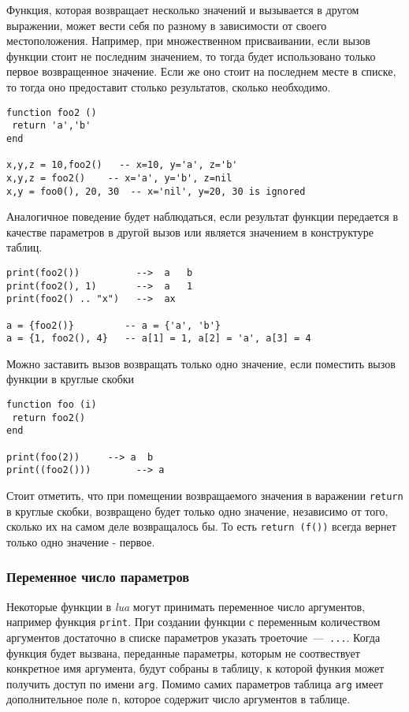 Функция, которая возвращает несколько значений и вызывается в другом выражении, может вести себя по разному в зависимости от своего местоположения. Например, при множественном присваивании, если вызов функции стоит не последним значением, то тогда будет использовано только первое возвращенное значение. Если же оно стоит на последнем месте в списке, то тогда оно предоставит столько результатов, сколько необходимо.

\begin{lstlisting}
function foo2 ()
 return 'a','b' 
end

x,y,z = 10,foo2()   -- x=10, y='a', z='b'
x,y,z = foo2()    -- x='a', y='b', z=nil
x,y = foo0(), 20, 30  -- x='nil', y=20, 30 is ignored

\end{lstlisting}

Аналогичное поведение будет наблюдаться, если результат функции передается в качестве параметров в другой вызов или является значением в конструктуре таблиц.

\begin{lstlisting}
print(foo2())          -->  a   b
print(foo2(), 1)       -->  a   1
print(foo2() .. "x")   -->  ax  

a = {foo2()}         -- a = {'a', 'b'}
a = {1, foo2(), 4}   -- a[1] = 1, a[2] = 'a', a[3] = 4
\end{lstlisting}

Можно заставить вызов возвращать только одно значение, если поместить вызов функции в круглые скобки

\begin{lstlisting}
function foo (i)
 return foo2()
end

print(foo(2))     --> a  b
print((foo2()))        --> a
\end{lstlisting}

Стоит отметить, что при помещении возвращаемого значения в варажении \lstinline{return} в круглые скобки, возвращено будет только одно значение, независимо от того, сколько их на самом деле возвращалось бы. То есть \lstinline{return (f())} всегда вернет только одно значение - первое. 

\subsubsection{Переменное число параметров}

Некоторые функции в \emph{lua} могут принимать переменное число аргументов, например функция \lstinline{print}. При создании функции с переменным количеством аргументов достаточно в списке параметров указать троеточие~---~\lstinline{...}.  Когда функция будет вызвана, переданные параметры, которым не соотвествует конкретное имя аргумента, будут собраны в таблицу, к которой функия может получить доступ по имени \lstinline{arg}. Помимо самих параметров таблица \lstinline{arg} имеет дополнительное поле \lstinline{n}, которое содержит число аргументов в таблице. 

